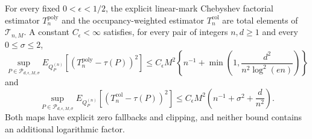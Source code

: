 For every fixed \(0<\epsilon<1/2\), the explicit linear-mark Chebyshev factorial estimator \(T_n^{\mathrm{poly}}\) and the occupancy-weighted estimator \(T_n^{\mathrm{col}}\) are total elements of \(\mathcal T_{n,M}\).  A constant \(C_{\epsilon}<\infty\) satisfies, for every pair of integers \(n,d\ge1\) and every \(0\le\sigma\le2\),
\[
 \sup_{P\in\mathcal P_{d,\epsilon,M,\sigma}}
 E_{Q_P^{(n)}}[(T_n^{\mathrm{poly}}-\tau(P))^2]
 \le C_{\epsilon}M^2\left\{n^{-1}+\min\left(1,\frac{d^2}{n^2\log^2(en)}\right)\right\}
\]
and
\[
 \sup_{P\in\mathcal P_{d,\epsilon,M,\sigma}}
 E_{Q_P^{(n)}}[(T_n^{\mathrm{col}}-\tau(P))^2]
 \le C_{\epsilon}M^2\left(n^{-1}+\sigma^2+\frac d{n^2}\right).
\]
Both maps have explicit zero fallbacks and clipping, and neither bound contains an additional logarithmic factor.